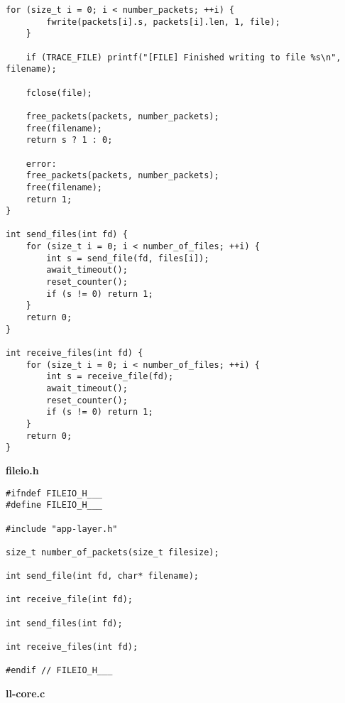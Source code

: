 \documentclass[subfiles]{main.tex}
\begin{document}
\begin{lstlisting}[style=rcom]
	for (size_t i = 0; i < number_packets; ++i) {
		fwrite(packets[i].s, packets[i].len, 1, file);
	}
	
	if (TRACE_FILE) printf("[FILE] Finished writing to file %s\n", filename);
	
	fclose(file);
	
	free_packets(packets, number_packets);
	free(filename);
	return s ? 1 : 0;
	
	error:
	free_packets(packets, number_packets);
	free(filename);
	return 1;
}

int send_files(int fd) {
	for (size_t i = 0; i < number_of_files; ++i) {
		int s = send_file(fd, files[i]);
		await_timeout();
		reset_counter();
		if (s != 0) return 1;
	}
	return 0;
}

int receive_files(int fd) {
	for (size_t i = 0; i < number_of_files; ++i) {
		int s = receive_file(fd);
		await_timeout();
		reset_counter();
		if (s != 0) return 1;
	}
	return 0;
}
\end{lstlisting}

{\Large\textbf{fileio.h}}

\begin{lstlisting}[style=rcom]
#ifndef FILEIO_H___
#define FILEIO_H___

#include "app-layer.h"

size_t number_of_packets(size_t filesize);

int send_file(int fd, char* filename);

int receive_file(int fd);

int send_files(int fd);

int receive_files(int fd);

#endif // FILEIO_H___
\end{lstlisting}

{\Large\textbf{ll-core.c}}
\end{document}
